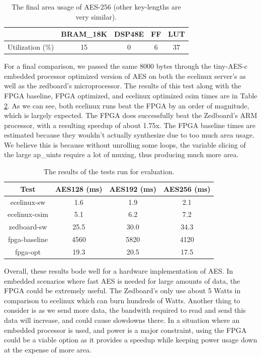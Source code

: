 \begin{table}[h]
\begin{center}
\begin{tabular}{| c | c | c | c | c |}\hline
& BRAM\_18K &  DSP48E &   FF    &  LUT \\\hline
Utilization (\%)  &       15 &      0 &       6 &     37 \\\hline
\end{tabular}
\label{table:aesarea}
\caption{The final area usage of AES-256 (other key-lengths are very similar).}
\end{center}
\end{table}

For a final comparison, we passed the same 8000 bytes through the tiny-AES-c embedded processor optimized version of AES on both the ecelinux server's as well as the zedboard's microprocessor. The results of this test along with the FPGA baseline, FPGA optimized, and ecelinux optimized csim times are in Table \ref{table:aestime}. As we can see, both ecelinux runs beat the FPGA by an order of magnitude, which is largely expected. The FPGA does successfully beat the Zedboard's ARM processor, with a resulting speedup of about 1.75x. The FPGA baseline times are estimated because they wouldn't actually synthesize due to too much area usage. We believe this is because without unrolling some loops, the variable slicing of the large ap\_uints require a lot of muxing, thus producing much more area. 

\begin{table}[h]
\begin{center}
\begin{tabular}{| c | c | c | c |}\hline
Test & AES128 (ms) & AES192 (ms) & AES256 (ms) \\\hline
ecelinux-sw & 1.6 & 1.9 & 2.1 \\\hline
ecelinux-csim & 5.1 & 6.2 & 7.2 \\\hline
zedboard-sw & 25.5 & 30.0 & 34.3 \\\hline
fpga-baseline & 4560 & 5820 & 4120 \\\hline
fpga-opt & 19.3 & 20.5 & 17.5 \\\hline
\end{tabular}
\label{table:aestime}
\caption{The results of the tests run for evaluation.}
\end{center}
\end{table}

Overall, these results bode well for a hardware implementation of AES. In embedded scenarios where fast AES is needed for large amounts of data, the FPGA could be extremely useful. The Zedboard's only use about 5 Watts in comparison to ecelinux which can burn hundreds of Watts. Another thing to consider is as we send more data, the bandwith required to read and send this data will increase, and could cause slowdowns there. In a situation where an embedded processor is used, and power is a major constraint, using the FPGA could be a viable option as it provides a speedup while keeping power usage down at the expense of more area. 